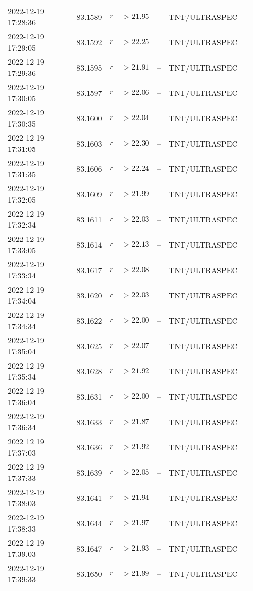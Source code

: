 \documentclass{nature_plusfigure}
\begin{document}
\begin{supplement}
\begin{center}
\begin{longtable}{lllllll}
2022-12-19 17:28:36 & 83.1589 & $r$ & $>21.95$ & -- & TNT/ULTRASPEC &  \\ 
2022-12-19 17:29:05 & 83.1592 & $r$ & $>22.25$ & -- & TNT/ULTRASPEC &  \\ 
2022-12-19 17:29:36 & 83.1595 & $r$ & $>21.91$ & -- & TNT/ULTRASPEC &  \\ 
2022-12-19 17:30:05 & 83.1597 & $r$ & $>22.06$ & -- & TNT/ULTRASPEC &  \\ 
2022-12-19 17:30:35 & 83.1600 & $r$ & $>22.04$ & -- & TNT/ULTRASPEC &  \\ 
2022-12-19 17:31:05 & 83.1603 & $r$ & $>22.30$ & -- & TNT/ULTRASPEC &  \\ 
2022-12-19 17:31:35 & 83.1606 & $r$ & $>22.24$ & -- & TNT/ULTRASPEC &  \\ 
2022-12-19 17:32:05 & 83.1609 & $r$ & $>21.99$ & -- & TNT/ULTRASPEC &  \\ 
2022-12-19 17:32:34 & 83.1611 & $r$ & $>22.03$ & -- & TNT/ULTRASPEC &  \\ 
2022-12-19 17:33:05 & 83.1614 & $r$ & $>22.13$ & -- & TNT/ULTRASPEC &  \\ 
2022-12-19 17:33:34 & 83.1617 & $r$ & $>22.08$ & -- & TNT/ULTRASPEC &  \\ 
2022-12-19 17:34:04 & 83.1620 & $r$ & $>22.03$ & -- & TNT/ULTRASPEC &  \\ 
2022-12-19 17:34:34 & 83.1622 & $r$ & $>22.00$ & -- & TNT/ULTRASPEC &  \\ 
2022-12-19 17:35:04 & 83.1625 & $r$ & $>22.07$ & -- & TNT/ULTRASPEC &  \\ 
2022-12-19 17:35:34 & 83.1628 & $r$ & $>21.92$ & -- & TNT/ULTRASPEC &  \\ 
2022-12-19 17:36:04 & 83.1631 & $r$ & $>22.00$ & -- & TNT/ULTRASPEC &  \\ 
2022-12-19 17:36:34 & 83.1633 & $r$ & $>21.87$ & -- & TNT/ULTRASPEC &  \\ 
2022-12-19 17:37:03 & 83.1636 & $r$ & $>21.92$ & -- & TNT/ULTRASPEC &  \\ 
2022-12-19 17:37:33 & 83.1639 & $r$ & $>22.05$ & -- & TNT/ULTRASPEC &  \\ 
2022-12-19 17:38:03 & 83.1641 & $r$ & $>21.94$ & -- & TNT/ULTRASPEC &  \\ 
2022-12-19 17:38:33 & 83.1644 & $r$ & $>21.97$ & -- & TNT/ULTRASPEC &  \\ 
2022-12-19 17:39:03 & 83.1647 & $r$ & $>21.93$ & -- & TNT/ULTRASPEC &  \\ 
2022-12-19 17:39:33 & 83.1650 & $r$ & $>21.99$ & -- & TNT/ULTRASPEC &  \\ 

\end{longtable}
\end{center}
\end{supplement}
\end{document}
